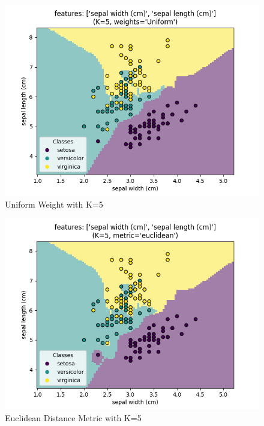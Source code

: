 \documentclass[journal]{IEEEtran}
\begin{document}
\begin{figure}[h!]
\includegraphics[scale=0.5]{uniform_k5.png}
\centering
\caption{Uniform Weight with K=5}
\label{fig:uniformk5}
\end{figure}

\begin{figure}[h!]
\includegraphics[scale=0.5]{euclidean_k5.png}
\centering
\caption{Euclidean Distance Metric with K=5}
\label{fig:euclk5}
\end{figure}
\end{document}

